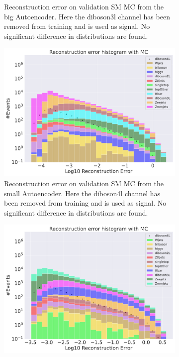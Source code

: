 \begin{figure}[h!]
\begin{subfigure}{.45\textwidth}
        \caption{Reconstruction error on validation SM MC from the big Autoencoder. Here the diboson3l channel has been removed from training and 
        is used as signal. No significant difference in distributions are found. }
        \label{fig:ae_big_diboson3l}
    \end{subfigure}
    \hfill
    \begin{subfigure}{.45\textwidth}
        \includegraphics[width=\textwidth]{Figures/AE_testing/small/b_data_recon_big_rm3_feats_sig_diboson4l.pdf}
        \caption{Reconstruction error on validation SM MC from the small Autoencoder. Here the diboson4l channel has been removed from training and 
        is used as signal. No significant difference in distributions are found. }
        \label{fig:ae_small_diboson4l}
    \end{subfigure}
    \hfill 
    \begin{subfigure}{.45\textwidth}
        \includegraphics[width=\textwidth]{Figures/AE_testing/big/b_data_recon_big_rm3_feats_sig_diboson4l.pdf}

\end{subfigure}
\end{figure}
